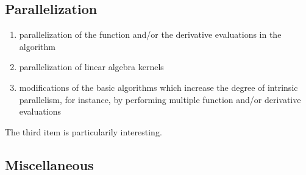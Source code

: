 \documentclass{article} %
\begin{document}
% 
% 



\subsection{Parallelization}


\begin{enumerate}
\item parallelization of the function and/or the derivative evaluations in the algorithm
\item parallelization of linear algebra kernels
\item modifications of the basic algorithms which increase the degree of intrinsic parallelism, for instance, by performing multiple function and/or derivative evaluations
\end{enumerate}

The third item is particularily interesting.






\subsection{Miscellaneous}
\end{document}
